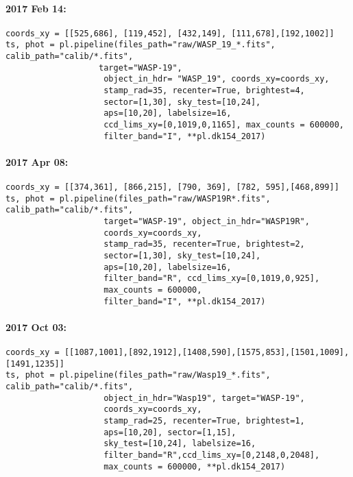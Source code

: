 \paragraph*{2017 Feb 14:}
\begin{verbatim}
coords_xy = [[525,686], [119,452], [432,149], [111,678],[192,1002]]
ts, phot = pl.pipeline(files_path="raw/WASP_19_*.fits", calib_path="calib/*.fits",
				   target="WASP-19",
                    object_in_hdr= "WASP_19", coords_xy=coords_xy,
                    stamp_rad=35, recenter=True, brightest=4,
                    sector=[1,30], sky_test=[10,24],
                    aps=[10,20], labelsize=16,
                    ccd_lims_xy=[0,1019,0,1165], max_counts = 600000,
                    filter_band="I", **pl.dk154_2017)
\end{verbatim}
\paragraph*{2017 Apr 08:}
\begin{verbatim}
coords_xy = [[374,361], [866,215], [790, 369], [782, 595],[468,899]]
ts, phot = pl.pipeline(files_path="raw/WASP19R*.fits", calib_path="calib/*.fits",
                    target="WASP-19", object_in_hdr="WASP19R",
                    coords_xy=coords_xy,
                    stamp_rad=35, recenter=True, brightest=2,
                    sector=[1,30], sky_test=[10,24],
                    aps=[10,20], labelsize=16,
                    filter_band="R", ccd_lims_xy=[0,1019,0,925],
                    max_counts = 600000,
                    filter_band="I", **pl.dk154_2017)
\end{verbatim}
\paragraph*{2017 Oct 03:}
\begin{verbatim}
coords_xy = [[1087,1001],[892,1912],[1408,590],[1575,853],[1501,1009],[1491,1235]]
ts, phot = pl.pipeline(files_path="raw/Wasp19_*.fits", calib_path="calib/*.fits",
                    object_in_hdr="Wasp19", target="WASP-19",
                    coords_xy=coords_xy,
                    stamp_rad=25, recenter=True, brightest=1,
                    aps=[10,20], sector=[1,15],
                    sky_test=[10,24], labelsize=16,
                    filter_band="R",ccd_lims_xy=[0,2148,0,2048],
                    max_counts = 600000, **pl.dk154_2017)
\end{verbatim}

